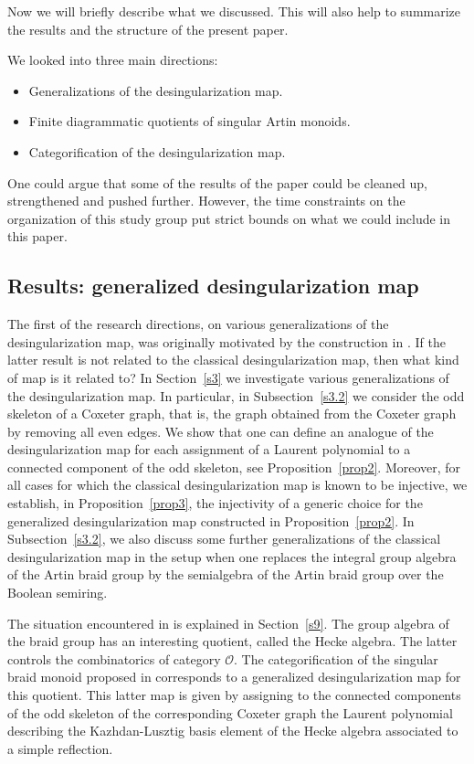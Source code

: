 \documentclass[a4paper]{amsart}
\begin{document}
Now we will briefly describe what we discussed. This will
also help to summarize the results and the structure of the present paper.

We looked into three main directions:
\begin{itemize}
\item Generalizations of the desingularization map.
\item Finite diagrammatic quotients of singular Artin monoids.
\item Categorification of the desingularization map.
\end{itemize}

One could argue that some of the results of the paper could
be cleaned up, strengthened and pushed further. However, the
time constraints on the organization of this 
study group put strict bounds on what we could include in this paper.

\subsection{Results: generalized desingularization map}\label{s1.3}

The first of the research directions, on various generalizations of the
desingularization map, was originally motivated by 
the construction in \cite[Theorem~1]{MaStr2}.
If the latter result is not related to the classical desingularization map,
then what kind of map is it related to?  In Section~\ref{s3} we
investigate various generalizations of the desingularization map.
In particular, in Subsection~\ref{s3.2} we consider the odd skeleton
of a Coxeter graph, that is, the graph obtained from the Coxeter graph 
by removing all even edges. We show that one can define an
analogue of the desingularization map for each assignment of a Laurent 
polynomial to a connected component of the odd skeleton, see 
Proposition~\ref{prop2}. Moreover, for all cases for which the
classical desingularization map is known to be injective, we establish,
in Proposition~\ref{prop3}, the injectivity of a generic choice for 
the generalized desingularization map constructed in Proposition~\ref{prop2}.
In Subsection~\ref{s3.2}, we also discuss some further generalizations of
the classical desingularization map in the setup when one replaces
the integral group algebra of the Artin braid group by the semialgebra
of the Artin braid group over the Boolean semiring. 

The situation encountered in \cite[Theorem~1]{MaStr2} is explained 
in Section~\ref{s9}. The group algebra of the braid group has an
interesting quotient, called the Hecke algebra. The latter controls
the combinatorics of category $\mathcal{O}$. The categorification of the
singular braid monoid proposed in \cite[Theorem~1]{MaStr2} corresponds to
a generalized desingularization map for this quotient. 
This latter map is given by assigning
to the connected components of the odd skeleton of the corresponding 
Coxeter graph the Laurent polynomial describing the Kazhdan-Lusztig basis
element of the Hecke algebra associated to a simple reflection.
\end{document}
